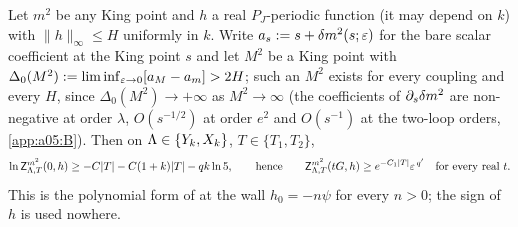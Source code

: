 \begin{theorem}\label{rot:thm:FS}
Let $m^2$ be any King point and $h$ a real $P_J$-periodic function (it may depend on $k$) with $\|h\|_\infty\le H$ uniformly in $k$. Write $a_s:= s+\delta m^2(s;\varepsilon)$ for the bare scalar coefficient at the King point $s$ and let $M^2$ be a King point with $\Delta_0(M^2):=\liminf_{\varepsilon\to0}[a_M-a_m]>2H$; such an $M^2$ exists for every coupling and every $H$, since $\Delta_0(M^2)\to+\infty$ as $M^2\to\infty$ (the coefficients of $\partial_s\delta m^2$ are non-negative at order $\lambda$, $O(s^{-1/2})$ at order $e^2$ and $O(s^{-1})$ at the two-loop orders, \cref{app:a05:B}). Then on $\Lambda\in\{Y_k,X_k\}$, $T\in\{T_1,T_2\}$,
\[
\ln\mathsf Z^{m^2}_{\Lambda,T}(0,h)\ge-C|T|-C(1+k)|T|-qk\ln5,\qquad\text{hence}\qquad\mathsf Z^{m^2}_{\Lambda,T}(tG,h)\ge e^{-C_1|T|}\varepsilon^{\,q'}\quad\text{for every real }t .
\]
This is the polynomial form of  at the wall $h_0=-n\psi$ for every $n>0$; the sign of $h$ is used nowhere.
\end{theorem}
